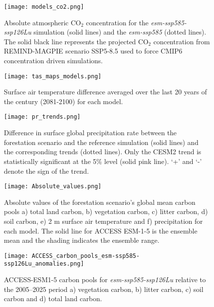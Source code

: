 \documentclass[draft,gbc]{agutexSI2019}
\begin{document}
\begin{figure}
    \centering
    \texttt{[image: models\_co2.png]}
    \caption{Absolute atmospheric CO$_2$ concentration for the \textit{esm-ssp585-ssp126Lu} simulation (solid lines) and the \textit{esm-ssp585} (dotted lines). The solid black line represents the projected CO$_2$ concentration from REMIND-MAGPIE scenario SSP5-8.5 used to force CMIP6 concentration driven simulations.}
    \label{fig:models_co2_absolute}
\end{figure}

\begin{figure}
    \centering
    \texttt{[image: tas\_maps\_models.png]}
    \caption{Surface air temperature difference averaged over the last 20 years of the century (2081-2100) for each model.}
    \label{fig:models_tas_maps}
\end{figure}

\begin{figure}
    \centering
    \texttt{[image: pr\_trends.png]}
    \caption{Difference in surface global precipitation rate between the forestation scenario and the reference simulation (solid lines) and the corresponding trends (dotted lines). Only the CESM2 trend is statistically significant at the 5\% level (solid pink line). `+' and `-' denote the sign of the trend.}
    \label{fig:models_pr_trends}
\end{figure}

\begin{figure}
    \texttt{[image: Absolute\_values.png]}
    \caption{Absolute values of the forestation scenario's global mean carbon pools a) total land carbon, b) vegetation carbon, c) litter carbon, d) soil carbon, e) 2 m surface air temperature and f) precipitation for each model. The solid line for ACCESS ESM-1-5 is the ensemble mean and the shading indicates the ensemble range.}
    \label{fig:models_absolute}
\end{figure}

\begin{figure}
    \texttt{[image: ACCESS\_carbon\_pools\_esm-ssp585-ssp126Lu\_anomalies.png]}
    \caption{ACCESS-ESM1-5 carbon pools for \textit{esm-ssp585-ssp126Lu} relative to the 2005--2025 period a) vegetation carbon, b) litter carbon, c) soil carbon and d) total land carbon.}
    \label{fig:access_cpools}
\end{figure}
\end{document}
